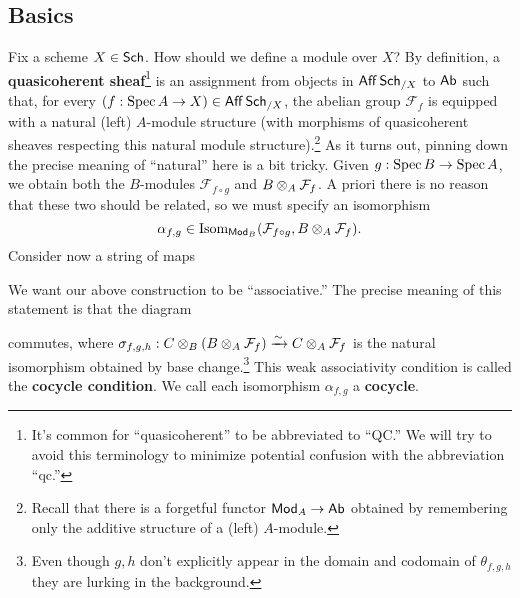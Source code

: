 \documentclass[11pt]{article}
\renewcommand{\F}{\mathcal{F}}
\begin{document}
\subsection{Basics}
Fix a scheme $X\in\operatorname{\mathsf{Sch}}$. How should we define a module over $X$? By definition, a \textbf{quasicoherent sheaf}\footnote{It's common for ``quasicoherent'' to be abbreviated to ``QC.'' We will try to avoid this terminology to minimize potential confusion with the abbreviation ``qc.''} is an assignment from objects in $\operatorname{\mathsf{Aff}}\operatorname{\mathsf{Sch}}_{/X}$ to $\operatorname{\mathsf{Ab}}$ such that, for every $(f: \operatorname{Spec} A\to X)\in\operatorname{\mathsf{Aff}}\operatorname{\mathsf{Sch}}_{/X}$, the abelian group $\F_f$ is equipped with a natural (left) $A$-module structure (with morphisms of quasicoherent sheaves respecting this natural module structure).\footnote{Recall that there is a forgetful functor $\operatorname{\mathsf{Mod}}_A\to\operatorname{\mathsf{Ab}}$ obtained by remembering only the additive structure of a (left) $A$-module.} As it turns out, pinning down the precise meaning of ``natural'' here is a bit tricky. Given $g: \operatorname{Spec} B\to\operatorname{Spec} A$, we obtain both the $B$-modules $\F_{f\circ g}$ and $B\tensor_A\F_f$. A priori there is no reason that these two should be related, so we must specify an isomorphism
$$\alpha_{f,g}\in\Isom_{\Mod_B}(\F_{f\circ g},B\tensor_A\F_f).$$
Consider now a string of maps
\begin{center}
\end{center}
We want our above construction to be ``associative.'' The precise meaning of this statement is that the diagram
\begin{center}
\end{center}
commutes, where $\sigma_{f,g,h}: C\tensor_B(B\tensor_A\F_f)\xto{\sim}C\tensor_A\F_f$ is the natural isomorphism obtained by base change.\footnote{Even though $g,h$ don't explicitly appear in the domain and codomain of $\theta_{f,g,h}$ they are lurking in the background.} This weak associativity condition is called the \textbf{cocycle condition}. We call each isomorphism $\alpha_{f,g}$ a \textbf{cocycle}. 
\end{document}
